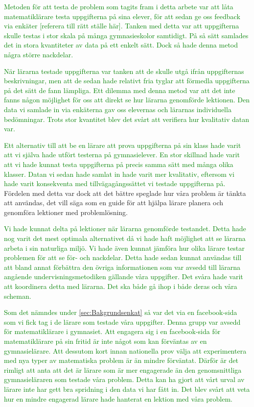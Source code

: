 \textcolor{green}{Metoden för att testa de problem som tagits fram i detta arbete var att låta matematiklärare testa uppgifterna på sina elever, för att sedan ge oss feedback via enkäter [referera till rätt ställe här]. Tanken med detta var att uppgifterna skulle testas i stor skala på många gymnasieskolor samtidigt. På så sätt samlades det in stora kvantiteter av data på ett enkelt sätt. Dock så hade denna metod några större nackdelar.}

\textcolor{green}{När lärarna testade uppgifterna var tanken att de skulle utgå ifrån uppgifternas beskrivningar, men att de sedan hade relativt fria tyglar att förmedla uppgifterna på det sätt de fann lämpliga. Ett dilemma med denna metod var att det inte fanns någon möjlighet för oss att direkt se hur lärarna genomförde lektionen. Den data vi samlade in via enkäterna gav oss elevernas och lärarnas individuella bedömningar. Trots stor kvantitet blev det svårt att verifiera hur kvalitativ datan var.}

\textcolor{green}{Ett alternativ till att be en lärare att prova uppgifterna på sin klass hade varit att vi själva hade utfört testerna på gymnasielever. En stor skillnad hade varit att vi hade kunnat testa uppgifterna på precis samma sätt med många olika klasser. Datan vi sedan hade samlat in hade varit mer kvalitativ, eftersom vi hade varit konsekventa med tillvägagångssättet vi testade uppgifterna på.}
    \textcolor{lila}{Fördelen med detta var dock att det bättre speglade hur våra problem är tänkta att användas, det vill säga som en guide för att hjälpa lärare  planera och genomföra lektioner med problemlösning.}
    
    \textcolor{green}{Vi hade kunnat delta på lektioner när lärarna genomförde testandet. Detta hade nog varit det mest optimala alternativet då vi hade haft möjlighet att se lärarna arbeta i sin naturliga miljö. Vi hade även kunnat jämföra hur olika lärare testar problemen för att se för- och nackdelar. Detta hade sedan kunnat användas till att bland annat förbättra den övriga informationen som var avsedd till lärarna angående undervisningsmetodiken gällande våra uppgifter. Det svåra hade varit att koordinera detta med lärarna. Det ska både gå ihop i både deras och våra scheman.}
    
    \textcolor{green}{Som det nämndes under \ref{sec:Bakgrundsenkat} så var det via en facebook-sida som vi fick tag i de lärare som testade våra uppgifter. Denna grupp var avsedd för matematiklärare i gymnasiet. Att engagera sig i en facebook-sida för matematiklärare på sin fritid är inte något som kan förväntas av en gymnasielärare. Att dessutom kort innan nationella prov välja att experimentera med nya typer av matematiska problem är än mindre förväntat. Därför är det rimligt att anta att det är lärare som är mer engagerade än den genomsnittliga gymnasieläraren som testade våra problem. Detta kan ha gjort att vårt urval av lärare inte har gett bra spridning i den data vi har fått in. Det blev svårt att veta hur en mindre engagerad lärare hade hanterat en lektion med våra problem.}


